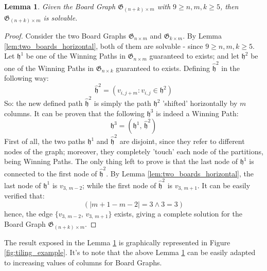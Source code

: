 \documentclass[conference]{IEEEtran}
\newtheorem{lemma}{Lemma}[section]
\begin{document}
\begin{lemma} \label{lem:tiling}
    Given the Board Graph $\mathfrak{G}_{(n+k) \times m}$ with $9 \ge n, m, k \ge 5$, then $\mathfrak{G}_{(n + k) \times m}$ is solvable.
\end{lemma}
\begin{proof}
    Consider the two Board Graphs $\mathfrak{G}_{n \times m}$ and $\mathfrak{G}_{k \times m}$.
    By Lemma \ref{lem:two_boards_horizontal}, both of them are solvable - since $9 \ge n, m, k \ge 5$.
    Let $\mathfrak{h}^1$ be one of the Winning Paths in $\mathfrak{G}_{n \times m}$ guaranteed to exists;
        and let $\mathfrak{h}^2$ be one of the Winning Paths in $\mathfrak{G}_{n \times k}$ guaranteed to exists.
    Defining $\hat{\mathfrak{h}}^2$ in the following way:
    $$
        \hat{\mathfrak{h}}^2 = (v_{i, j + m} : v_{i,j} \in \mathfrak{h}^2)
    $$
    So: the new defined path $\hat{\mathfrak{h}}^2$ is simply the path $\mathfrak{h}^2$ 'shifted' horizontally by $m$ columns.
        It can be proven that the following $\mathfrak{h}^3$ is indeed a Winning Path:
    $$
        \mathfrak{h}^3 = (\mathfrak{h}^1,\,\hat{\mathfrak{h}}^2)
    $$
    First of all, the two paths $\mathfrak{h}^1$ and $\hat{\mathfrak{h}}^2$ are disjoint, since they refer to different nodes of the graph; moreover, they completely 'touch' each node of the partitions, being Winning Paths.
    The only thing left to prove is that the last node of $\mathfrak{h}^1$ is connected to the first node of $\hat{\mathfrak{h}}^2$.
    By Lemma \ref{lem:two_boards_horizontal}, the last node of $\mathfrak{h}^1$ is $v_{3,\,m-2}$; while the first node of $\hat{\mathfrak{h}}^2$ is $v_{3,\,m+1}$.
    It can be easily verified that:
    $$
        (|m+1 - m-2| = 3 \land 3 = 3)
    $$
    hence, the edge $\{v_{3,\,m-2},\,v_{3,\,m+1}\}$ exists, giving a complete solution for the Board Graph $\mathfrak{G}_{(n + k) \times m}$.
\end{proof}

The result exposed in the Lemma \ref{lem:tiling} is graphically represented in Figure \ref{fig:tiling_example}.
It's to note that the above Lemma \ref{lem:tiling} can be easily adapted to increasing values of columns for Board Graphs.
\end{document}
